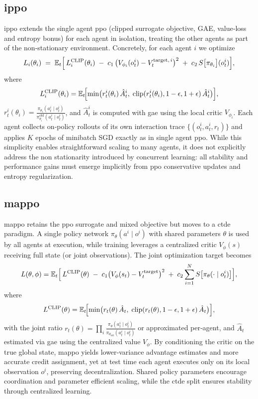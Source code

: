\subsection{\gls{ippo}}
\gls{ippo} \cite{witt_is_2020} extends the single agent \gls{ppo} (clipped surrogate objective, GAE, value‐loss and entropy bonus) for each agent in isolation, treating the other agents as part of the non‐stationary environment.  Concretely, for each agent \(i\) we optimize
\[
  L_i(\theta_i) \;=\; 
  \mathbb{E}_t \Bigl[\,L^{\mathrm{CLIP}}_i(\theta_i) \;-\; c_1\,\bigl(V_{\phi_i}(o^i_t)-V^{\text{target},\,i}_t\bigr)^2
    \;+\; c_2\,S\bigl[\pi_{\theta_i}\bigr](o^i_t)\Bigr],
\]
where
\[
  L^{\mathrm{CLIP}}_i(\theta_i)
  = \mathbb{E}_t\!\Bigl[\min\bigl(r^i_t(\theta_i)\,\hat A^i_t,\;\mathrm{clip}(r^i_t(\theta_i),1-\epsilon,1+\epsilon)\,\hat A^i_t\bigr)\Bigr],
\]
\(r^i_t(\theta_i)\!=\!\frac{\pi_{\theta_i}(a^i_t\mid o^i_t)}{\pi_{\theta_i}^{\mathrm{old}}(a^i_t\mid o^i_t)}\), and \(\hat A^i_t\) is computed with \gls{gae} using the local critic \(V_{\phi_i}\).  Each agent collects on‐policy rollouts of its own interaction trace \(\{(o^i_t,a^i_t,r_t)\}\) and applies \(K\) epochs of minibatch SGD exactly as in single agent \gls{ppo}.  While this simplicity enables straightforward scaling to many agents, it does not explicitly address the non stationarity introduced by concurrent learning: all stability and performance gains must emerge implicitly from \gls{ppo} conservative updates and entropy regularization.

\subsection{\gls{mappo}}
\gls{mappo} \cite{yu_surprising_2022} retains the \gls{ppo} surrogate and mixed objective but moves to a \gls{ctde} paradigm.  A single policy network \(\pi_\theta(a^i\mid o^i)\) with shared parameters \(\theta\) is used by all agents at execution, while training leverages a centralized critic \(V_\phi(s)\) receiving full state (or joint observations).  The joint optimization target becomes
\[
  L(\theta,\phi) = \mathbb{E}_t\Bigl[\,L^{\mathrm{CLIP}}(\theta)
   \;-\; c_1\bigl(V_\phi(s_t)-V^{\text{target}}_t\bigr)^2
   \;+\; c_2\sum_{i=1}^N S\bigl[\pi_\theta(\cdot\mid o^i_t)\bigr]\Bigr],
\]
where
\[
  L^{\mathrm{CLIP}}(\theta)
  = \mathbb{E}_t\!\Bigl[\min\bigl(r_t(\theta)\,\hat A_t,\;\mathrm{clip}(r_t(\theta),1-\epsilon,1+\epsilon)\,\hat A_t\bigr)\Bigr],
\]
with the joint ratio \(r_t(\theta)=\prod_i \frac{\pi_\theta(a^i_t\mid o^i_t)}{\pi_{\theta_{\text{old}}}(a^i_t\mid o^i_t)}\) or approximated per‐agent, and \(\hat A_t\) estimated via \gls{gae} using the centralized value \(V_\phi\).  By conditioning the critic on the true global state, \gls{mappo} yields lower‐variance advantage estimates and more accurate credit assignment, yet at test time each agent executes only on its local observation \(o^i\), preserving decentralization.  Shared policy parameters encourage coordination and parameter efficient scaling, while the \gls{ctde} split ensures stability through centralized learning.


